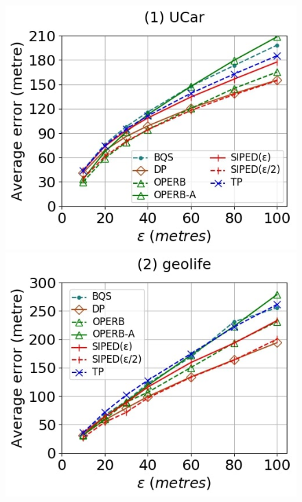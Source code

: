 {\begin{figure}[tb!]
	\centering
	\includegraphics[scale = 0.25]{Figures/Exp-where-PED-error-epsilon-service.jpg}\hspace{0.5ex}
	\includegraphics[scale = 0.25]{Figures/Exp-where-PED-error-epsilon-geolife.jpg}\hspace{0.5ex}

\end{figure}}
